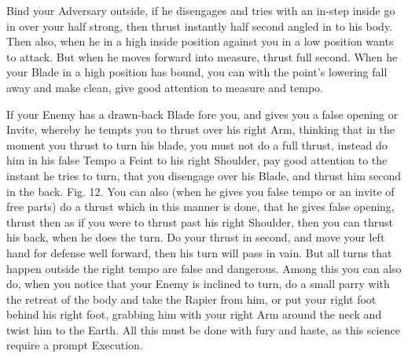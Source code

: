 Bind your Adversary outside, if he disengages and tries with an in-step inside go in over your half strong, then thrust instantly half second angled in to his body. Then also, when he in a high inside position against you in a low position wants to attack. But when he moves forward into measure, thrust full second. When he your Blade in a high position has bound, you can with the point's lowering fall away and make clean, give good attention to measure and tempo.




If your Enemy has a drawn-back Blade fore you, and gives you a false opening or Invite, whereby he tempts you to thrust over his right Arm, thinking that in the moment you thrust to turn his blade, you must not do a full thrust, instead do him in his false Tempo a Feint to his right Shoulder, pay good attention to the instant he tries to turn, that you disengage over his Blade, and thrust him second in the back. Fig. 12. You can also (when he gives you false tempo or an invite of free parts) do a thrust which in this manner is done, that he gives false opening, thrust then as if you were to thrust past his right Shoulder, then you can thrust his back, when he does the turn. Do your thrust in second, and move your left hand for defense well forward, then his turn will pass in vain. But all turns that happen outside the right tempo are false and dangerous. Among this you can also do, when you notice that your Enemy is inclined to turn, do a small parry with the retreat of the body and take the Rapier from him, or put your right foot behind his right foot, grabbing him with your right Arm around the neck and twist him to the Earth. All this must be done with fury and haste, as this science require a prompt Execution.

